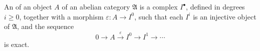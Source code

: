 An  of an object $A$ of an abelian category $\mathfrak{A}$ is a complex $I^\bullet$, defined in degrees $i \geqslant 0$, together with a morphism $\varepsilon: A \to I^0$, such that each $I^i$ is an injective object of $\mathfrak{A}$, and the sequence
$$0 \to A \xrightarrow{\varepsilon} I^0 \to I^1 \to \cdots$$
is exact.
